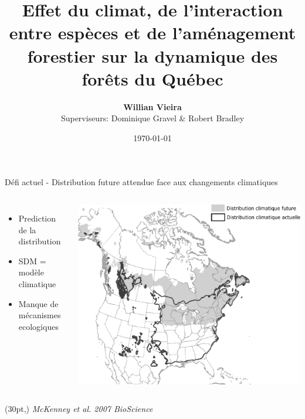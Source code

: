 \documentclass[11pt, compress, aspectratio=1610]{beamer}
\title{Effet du climat, de l’interaction entre espèces et de l’aménagement
forestier sur la dynamique des forêts du Québec}
\subtitle{}
\date{\today}
\author{\textbf{Willian Vieira}\\
Superviseurs: Dominique Gravel \& Robert Bradley \newline}
\institute{}
\newcommand\smallcitation[1]{%
\begin{textblock*}{\textwidth}(30pt,\textheight)
	\raggedleft \footnotesize\textit{#1}
\end{textblock*}}
\providecommand{\tightlist}{%
  \setlength{\itemsep}{0pt}\setlength{\parskip}{0pt}}
\newcommand{\begincols}{\begin{columns}}
\newcommand{\stopcols}{\end{columns}}
\begin{document}
\maketitle

\begin{frame}{Défi actuel - Distribution future attendue face aux
changements climatiques}
\protect\hypertarget{duxe9fi-actuel---distribution-future-attendue-face-aux-changements-climatiques}{}

\begincols
{}
  \begin{itemize}
  \tightlist
  \item
    Prediction de la distribution
  \item
    SDM = modèle climatique
  \item
    Manque de mécanismes ecologiques
\end{itemize}
\hfill{}
  \centering

\includegraphics[scale=0.4]{figures/mckenney.pdf}

\par
\stopcols

\smallcitation{McKenney \textit{et al}. 2007 BioScience}

\end{frame}
\end{document}
